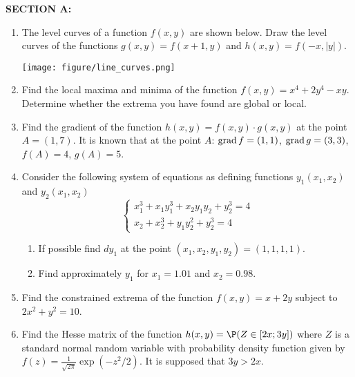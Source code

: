 \textbf{SECTION A:}
\begin{enumerate}

\item The level curves of a function $f(x,y)$ are shown below. Draw the level curves of the functions $g(x,y)=f(x+1,y)$ and $h(x,y)=f(-x,|y|)$.



\begin{minipage}{0.6\textwidth}
 \begin{center}
  \texttt{[image: figure/line\_curves.png]}
%  
  \end{center}
\end{minipage}
  


\item Find the local maxima and minima of the function $f(x,y)=x^4+2y^4-xy$. Determine whether the extrema you have found are global or local.

\item Find the gradient of the function $h(x,y)=f(x,y)\cdot g(x,y)$ at the point $A=(1,7)$. It is known that at the point $A$: $\mathrm{grad}\, f=(1,1)$, $\mathrm{grad}\, g=(3,3)$, $f(A)=4$, $g(A)=5$.

\item Consider the following system of equations as defining functions $y_1(x_1,x_2)$ and $y_2(x_1,x_2)$
\[
\left\{
\begin{array}{c}
x_1^3+x_1 y_1^3+x_2 y_1 y_2+y_2^3=4 \\
x_2+x_2^3+y_1 y_2^2+y_2^3=4
\end{array}
\right.
\]
\begin{enumerate}
\item If possible find $dy_1$ at the point $(x_1,x_2,y_1,y_2)=(1,1,1,1)$.
\item Find approximately $y_1$ for $x_1=1.01$ and $x_2=0.98$.
\end{enumerate}
\item Find the constrained extrema of the function $f(x,y)=x+2y$ subject to $2x^2+y^2=10$.

\item Find the Hesse matrix of the function $h(x,y)=\P( Z \in [2x;3y])$ where $Z$ is a standard normal random variable with probability density function given by $f(z)=\frac{1}{\sqrt{2\pi}}\exp(-z^2/2)$. It is supposed that $3y>2x$.

\end{enumerate}

